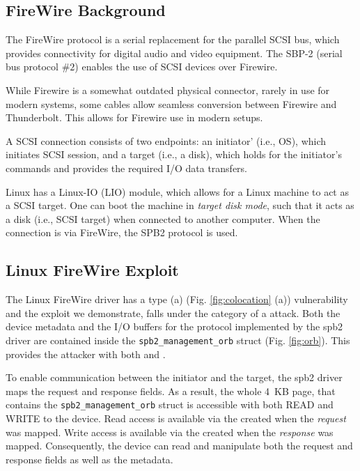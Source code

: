 \subsection{FireWire Background}

The FireWire protocol is a serial replacement for the parallel SCSI bus, which provides connectivity for digital audio and video equipment. The SBP-2 (serial bus protocol $\#2$) enables the use of SCSI devices over Firewire. 

While Firewire is a somewhat outdated physical connector, rarely in use for modern systems, some cables allow seamless conversion between Firewire and Thunderbolt. This allows for Firewire use in modern setups.

A SCSI connection consists of two endpoints: an initiator' (i.e., OS), which initiates SCSI session, and a target (i.e., a disk), which holds for the initiator's commands and provides the required I/O data transfers. 

Linux has a Linux-IO (LIO) module, which allows for a Linux machine to act as a SCSI target. One can boot the machine in \emph{target disk mode}, such that it acts as a disk (i.e., SCSI target) when connected to another computer. When the connection is via FireWire, the SPB2 protocol is used.

\subsection{Linux FireWire Exploit} \label{sec:sbp2_attack}

The Linux FireWire driver has a type (a) (Fig. \ref{fig:colocation} (a)) \subpage{} vulnerability and the exploit we demonstrate, falls under the category of a \simple{} attack. Both the device metadata and the I/O buffers for the \spb{} protocol implemented by the spb2 driver are contained inside the \texttt{spb2\_management\_orb} struct (Fig. \ref{fig:orb}). This provides the attacker with both \means{} and \oportunity{}.

To enable communication between the initiator and the target, the spb2 driver maps the request and response fields. As a result, the whole 4~KB page, that contains the \texttt{spb2\_management\_orb} struct is accessible with both READ and WRITE to the device. Read access is available via the \iova{} created when the \emph{request} was mapped. Write access is available via the \iova{} created when the \emph{response} was mapped. Consequently, the device can read and manipulate both the request and response fields as well as the metadata. 

